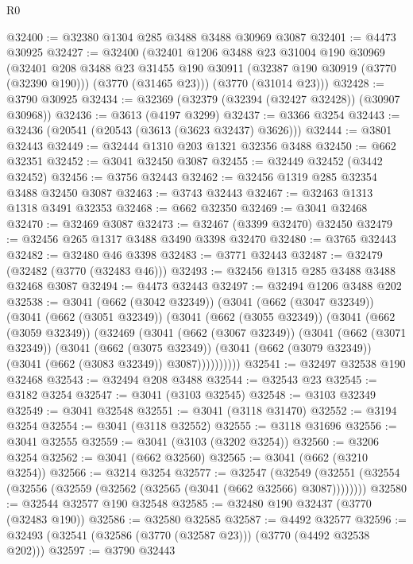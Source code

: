 \begin{lexlean}{R0}
\begin{coremodule}
@32400 := @32380 @1304 @285 @3488 @3488 @30969 @3087
@32401 := @4473 @30925
@32427 := @32400
    (@32401
      @1206
      @3488
      @23
      @31004
      @190
      @30969
      (@32401
        @208
        @3488
        @23
        @31455
        @190
        @30911
        (@32387 @190 @30919 (@3770 (@32390 @190)))
        (@3770 (@31465 @23)))
      (@3770 (@31014 @23)))
@32428 := @3790 @30925
@32434 := @32369 (@32379 (@32394 (@32427 @32428)) (@30907 @30968))
@32436 := @3613 (@4197 @3299)
@32437 := @3366 @3254
@32443 := @32436 (@20541 (@20543 (@3613 (@3623 @32437) @3626)))
@32444 := @3801 @32443
@32449 := @32444 @1310 @203 @1321 @32356 @3488
@32450 := @662 @32351
@32452 := @3041 @32450 @3087
@32455 := @32449 @32452 (@3442 @32452)
@32456 := @3756 @32443
@32462 := @32456 @1319 @285 @32354 @3488 @32450 @3087
@32463 := @3743 @32443
@32467 := @32463 @1313 @1318 @3491 @32353
@32468 := @662 @32350
@32469 := @3041 @32468
@32470 := @32469 @3087
@32473 := @32467 (@3399 @32470) @32450
@32479 := @32456 @265 @1317 @3488 @3490 @3398 @32470
@32480 := @3765 @32443
@32482 := @32480 @46 @3398
@32483 := @3771 @32443
@32487 := @32479 (@32482 (@3770 (@32483 @46)))
@32493 := @32456 @1315 @285 @3488 @3488 @32468 @3087
@32494 := @4473 @32443
@32497 := @32494 @1206 @3488 @202
@32538 := @3041
    (@662 (@3042 @32349))
    (@3041
      (@662 (@3047 @32349))
      (@3041
        (@662 (@3051 @32349))
        (@3041
          (@662 (@3055 @32349))
          (@3041
            (@662 (@3059 @32349))
            (@32469
              (@3041
                (@662 (@3067 @32349))
                (@3041
                  (@662 (@3071 @32349))
                  (@3041
                    (@662 (@3075 @32349))
                    (@3041 (@662 (@3079 @32349)) (@3041 (@662 (@3083 @32349)) @3087))))))))))
@32541 := @32497 @32538 @190 @32468
@32543 := @32494 @208 @3488
@32544 := @32543 @23
@32545 := @3182 @3254
@32547 := @3041 (@3103 @32545)
@32548 := @3103 @32349
@32549 := @3041 @32548
@32551 := @3041 (@3118 @31470)
@32552 := @3194 @3254
@32554 := @3041 (@3118 @32552)
@32555 := @3118 @31696
@32556 := @3041 @32555
@32559 := @3041 (@3103 (@3202 @3254))
@32560 := @3206 @3254
@32562 := @3041 (@662 @32560)
@32565 := @3041 (@662 (@3210 @3254))
@32566 := @3214 @3254
@32577 := @32547
    (@32549 (@32551 (@32554 (@32556 (@32559 (@32562 (@32565 (@3041 (@662 @32566) @3087))))))))
@32580 := @32544 @32577 @190 @32548
@32585 := @32480 @190 @32437 (@3770 (@32483 @190))
@32586 := @32580 @32585
@32587 := @4492 @32577
@32596 := @32493 (@32541 (@32586 (@3770 (@32587 @23))) (@3770 (@4492 @32538 @202)))
@32597 := @3790 @32443

\end{coremodule}
\end{lexlean}
